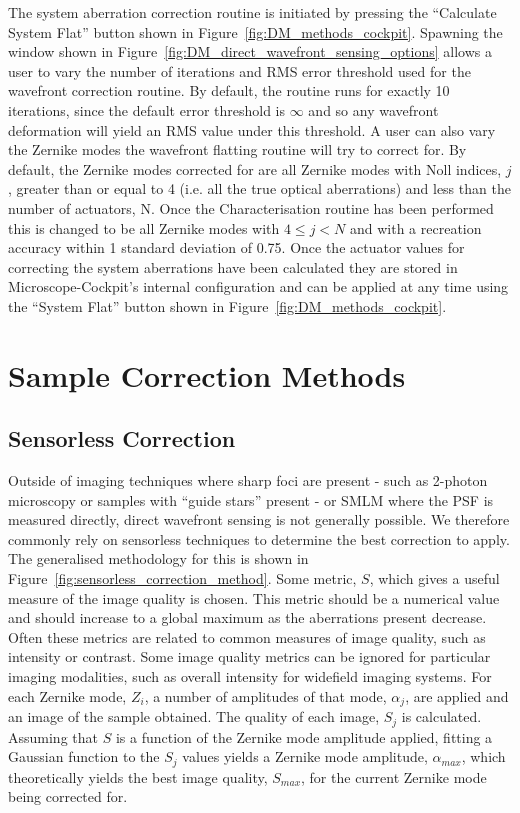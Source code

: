 The system aberration correction routine is initiated by pressing the ``Calculate System Flat'' button shown in Figure~\ref{fig:DM_methods_cockpit}. Spawning the window shown in Figure~\ref{fig:DM_direct_wavefront_sensing_options} allows a user to vary the number of iterations and RMS error threshold used for the wavefront correction routine. By default, the routine runs for exactly 10 iterations, since the default error threshold is $\infty$ and so any wavefront deformation will yield an RMS value under this threshold. A user can also vary the Zernike modes the wavefront flatting routine will try to correct for. By default, the Zernike modes corrected for are all Zernike modes with Noll indices, $j$, greater than or equal to 4 (i.e. all the true optical aberrations) and less than the number of actuators, N. Once the Characterisation routine has been performed this is changed to be all Zernike modes with $4 \le j < N$ and with a recreation accuracy within 1 standard deviation of 0.75.  Once the actuator values for correcting the system aberrations have been calculated they are stored in Microscope-Cockpit's internal configuration and can be applied at any time using the ``System Flat'' button shown in Figure~\ref{fig:DM_methods_cockpit}.

\section{Sample Correction Methods}
\label{sec:sample_correction_methods}

\subsection{Sensorless Correction}
\label{subsec:sensorless_correction}

Outside of imaging techniques where sharp foci are present - such as 2-photon microscopy or samples with ``guide stars'' present - or SMLM where the PSF is measured directly, direct wavefront sensing is not generally possible\cite{ji2017adaptive,wang2014rapid,wang2015direct}. We therefore commonly rely on sensorless techniques to determine the best correction to apply. The generalised methodology for this is shown in Figure~\ref{fig:sensorless_correction_method}. Some metric, $S$, which gives a useful measure of the image quality is chosen. This metric should be a numerical value and should increase to a global maximum as the aberrations present decrease. Often these metrics are related to common measures of image quality, such as intensity or contrast. Some image quality metrics can be ignored for particular imaging modalities, such as overall intensity for widefield imaging systems. For each Zernike mode, $Z_{i}$, a number of amplitudes of that mode, $\alpha_{j}$, are applied and an image of the sample obtained. The quality of each image, $S_{j}$ is calculated. Assuming that $S$ is a function of the Zernike mode amplitude applied,	fitting a Gaussian function to the $S_{j}$ values yields a Zernike mode amplitude, $\alpha_{max}$, which theoretically yields the best image quality, $S_{max}$, for the current Zernike mode being corrected for. 

